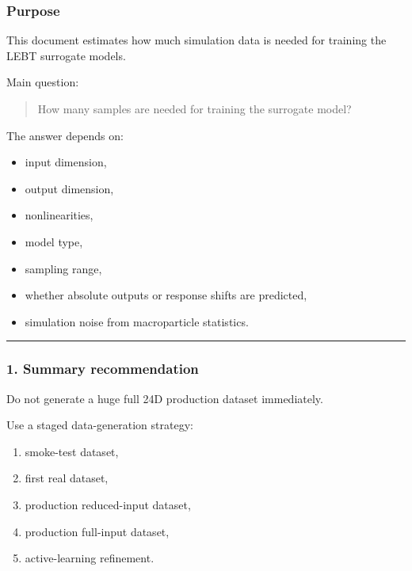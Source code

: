 \documentclass[
]{article}
\providecommand{\tightlist}{%
  \setlength{\itemsep}{0pt}\setlength{\parskip}{0pt}}
\begin{document}
\hypertarget{purpose-4}{%
\subsubsection{Purpose}\label{purpose-4}}

This document estimates how much simulation data is needed for training
the LEBT surrogate models.

Main question:

\begin{quote}
How many samples are needed for training the surrogate model?
\end{quote}

The answer depends on:

\begin{itemize}
\tightlist
\item
  input dimension,
\item
  output dimension,
\item
  nonlinearities,
\item
  model type,
\item
  sampling range,
\item
  whether absolute outputs or response shifts are predicted,
\item
  simulation noise from macroparticle statistics.
\end{itemize}

\begin{center}\rule{0.5\linewidth}{0.5pt}\end{center}

\hypertarget{summary-recommendation}{%
\subsubsection{1. Summary recommendation}\label{summary-recommendation}}

Do not generate a huge full 24D production dataset immediately.

Use a staged data-generation strategy:

\begin{enumerate}
\def\labelenumi{\arabic{enumi}.}
\tightlist
\item
  smoke-test dataset,
\item
  first real dataset,
\item
  production reduced-input dataset,
\item
  production full-input dataset,
\item
  active-learning refinement.
\end{enumerate}
\end{document}
